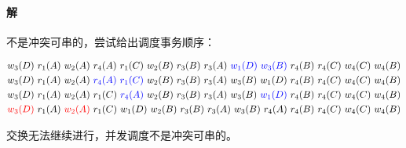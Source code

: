 \documentclass{article}
\newcommand{\tikzmark}[3][]
  {\tikz[remember picture, baseline, every node/.style={inner sep=0,outer sep=0}]
    \node [anchor = base, #1](#2) {#3};}
\begin{document}
\paragraph{解}
不是冲突可串的，尝试给出调度事务顺序：
\begin{large}
    \begin{align*}
        w_3(D)\ r_1(A)\ w_2(A)\ r_4(A)\ r_1(C)\ w_2(B)\ r_3(B)\ r_3(A)\ \tikzmark[blue]{Anchor2-a}{$w_1(D)$}\ \tikzmark[blue]{Anchor2-b}{$w_3(B)$}\ r_4(B)\ r_4(C)\ w_4(C)\ w_4(B) \\
        w_3(D)\ r_1(A)\ w_2(A)\ \tikzmark[blue]{Anchor3-a}{$r_4(A)$}\ \tikzmark[blue]{Anchor3-b}{$r_1(C)$}\ w_2(B)\ r_3(B)\ r_3(A)\ w_3(B)\ w_1(D)\ r_4(B)\ r_4(C)\ w_4(C)\ w_4(B) \\
        w_3(D)\ r_1(A)\ w_2(A)\ r_1(C)\ \tikzmark[blue]{Anchor4-a}{$r_4(A)$}\ w_2(B)\ r_3(B)\ r_3(A)\ w_3(B)\ \tikzmark[blue]{Anchor4-b}{$w_1(D)$}\ r_4(B)\ r_4(C)\ w_4(C)\ w_4(B) \\
        \tikzmark[red]{Anchor5-a}{$w_3(D)$}\ r_1(A)\ \tikzmark[red]{Anchor5-b}{$w_2(A)$}\ r_1(C)\ w_1(D)\ w_2(B)\ r_3(B)\ r_3(A)\ w_3(B)\ r_4(A)\ r_4(B)\ r_4(C)\ w_4(C)\ w_4(B) %
    \end{align*}
\end{large}
交换无法继续进行，并发调度不是冲突可串的。
\end{document}

